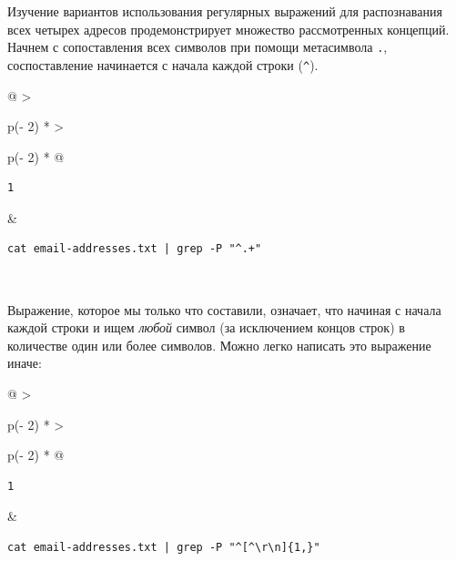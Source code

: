 \documentclass{article}
\begin{document}
Изучение вариантов использования регулярных выражений для распознавания
всех четырех адресов продемонстрирует множество рассмотренных концепций.
Начнем с сопоставления всех символов при помощи метасимвола \texttt{.},
соспоставление начинается с начала каждой строки (\texttt{\^{}}).

\begin{longtable}[]{@{}
  >{\raggedright\arraybackslash}p{(\columnwidth - 2\tabcolsep) * }
  >{\raggedright\arraybackslash}p{(\columnwidth - 2\tabcolsep) * }@{}}
\toprule
\endhead
\begin{minipage}[t]{\linewidth}\raggedright
\begin{verbatim}
1
\end{verbatim}
\end{minipage} & \begin{minipage}[t]{\linewidth}\raggedright
\begin{verbatim}
cat email-addresses.txt | grep -P "^.+"
\end{verbatim}
\end{minipage} \\ \addlinespace
\bottomrule
\end{longtable}

Выражение, которое мы только что составили, означает, что начиная с
начала каждой строки и ищем \emph{любой} символ (за исключением концов
строк) в количестве один или более символов. Можно легко написать это
выражение иначе:

\begin{longtable}[]{@{}
  >{\raggedright\arraybackslash}p{(\columnwidth - 2\tabcolsep) * }
  >{\raggedright\arraybackslash}p{(\columnwidth - 2\tabcolsep) * }@{}}
\toprule
\endhead
\begin{minipage}[t]{\linewidth}\raggedright
\begin{verbatim}
1
\end{verbatim}
\end{minipage} & \begin{minipage}[t]{\linewidth}\raggedright
\begin{verbatim}
cat email-addresses.txt | grep -P "^[^\r\n]{1,}"
\end{verbatim}
\end{minipage} \\ \addlinespace
\bottomrule
\end{longtable}
\end{document}
